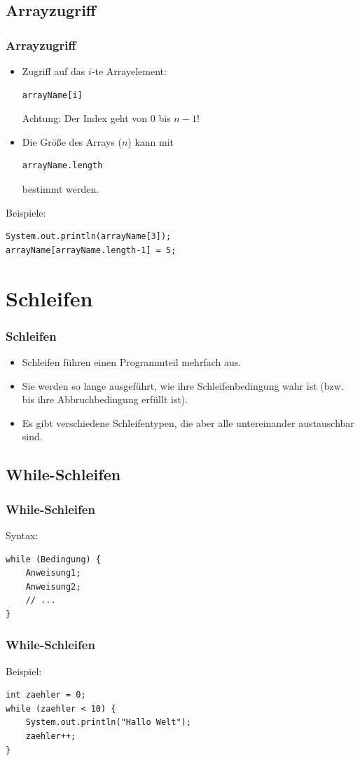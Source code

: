 \documentclass[final]{beamer}
\begin{document}
\subsection{Arrayzugriff}
\begin{frame}[containsverbatim]
	\frametitle{Arrayzugriff}
\begin{itemize}
	\item{Zugriff auf das $i$-te Arrayelement:
	\begin{lstlisting}
arrayName[i]
	\end{lstlisting}
	Achtung: Der Index geht von $0$ bis $n-1$!
	}
	\item{Die Größe des Arrays ($n$) kann mit
	\begin{lstlisting}
arrayName.length
	\end{lstlisting}
	bestimmt werden.
	}
	\end{itemize}

	Beispiele:
	\begin{lstlisting}
System.out.println(arrayName[3]);
arrayName[arrayName.length-1] = 5;
	\end{lstlisting}
\end{frame}

\section{Schleifen}
\begin{frame}
	\frametitle{Schleifen}
	\begin{itemize}
	\item{Schleifen führen einen Programmteil mehrfach aus.}
	\item{Sie werden so lange ausgeführt, wie ihre Schleifenbedingung wahr ist
		(bzw. bis ihre Abbruchbedingung erfüllt ist).}
	\item{Es gibt verschiedene Schleifentypen, die aber alle untereinander austauschbar sind.}
	\end{itemize}
\end{frame}

\subsection{While-Schleifen}
\begin{frame}[containsverbatim]
	\frametitle{While-Schleifen}
	Syntax:
	\begin{lstlisting}
while (Bedingung) {
	Anweisung1;
	Anweisung2;
	// ...
}
	\end{lstlisting}
\end{frame}
\begin{frame}[containsverbatim]
	\frametitle{While-Schleifen}
	Beispiel:
	\begin{lstlisting}
int zaehler = 0;
while (zaehler < 10) {
	System.out.println("Hallo Welt");
	zaehler++;
}
	\end{lstlisting}
\end{frame}
\end{document}
